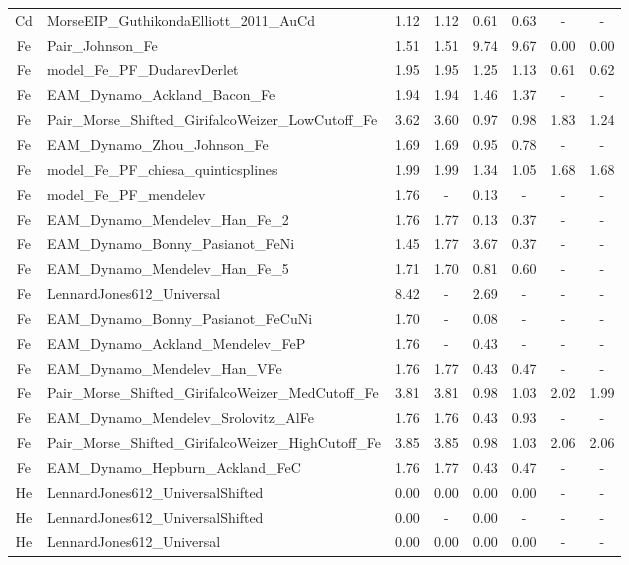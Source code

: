 \documentclass[%
 reprint,
 amsmath,amssymb,
 aps,
]{revtex4-1}
\begin{document}
\begin{longtable*}{@{\extracolsep{\fill}} c l c c c c c c}
 Cd & MorseEIP\_GuthikondaElliott\_2011\_AuCd & 1.12 & 1.12 & 0.61 & 0.63 & - & - \\
 Fe & Pair\_Johnson\_Fe & 1.51 & 1.51 & 9.74 & 9.67 & 0.00 & 0.00 \\
 Fe & model\_Fe\_PF\_DudarevDerlet & 1.95 & 1.95 & 1.25 & 1.13 & 0.61 & 0.62 \\
 Fe & EAM\_Dynamo\_Ackland\_Bacon\_Fe & 1.94 & 1.94 & 1.46 & 1.37 & - & - \\
 Fe & Pair\_Morse\_Shifted\_GirifalcoWeizer\_LowCutoff\_Fe & 3.62 & 3.60 & 0.97 & 0.98 & 1.83 & 1.24 \\
 Fe & EAM\_Dynamo\_Zhou\_Johnson\_Fe & 1.69 & 1.69 & 0.95 & 0.78 & - & - \\
 Fe & model\_Fe\_PF\_chiesa\_quinticsplines & 1.99 & 1.99 & 1.34 & 1.05 & 1.68 & 1.68 \\
 Fe & model\_Fe\_PF\_mendelev & 1.76 & - & 0.13 & - & - & - \\
 Fe & EAM\_Dynamo\_Mendelev\_Han\_Fe\_2 & 1.76 & 1.77 & 0.13 & 0.37 & - & - \\
 Fe & EAM\_Dynamo\_Bonny\_Pasianot\_FeNi & 1.45 & 1.77 & 3.67 & 0.37 & - & - \\
 Fe & EAM\_Dynamo\_Mendelev\_Han\_Fe\_5 & 1.71 & 1.70 & 0.81 & 0.60 & - & - \\
 Fe & LennardJones612\_Universal & 8.42 & - & 2.69 & - & - & - \\
 Fe & EAM\_Dynamo\_Bonny\_Pasianot\_FeCuNi & 1.70 & - & 0.08 & - & - & - \\
 Fe & EAM\_Dynamo\_Ackland\_Mendelev\_FeP & 1.76 & - & 0.43 & - & - & - \\
 Fe & EAM\_Dynamo\_Mendelev\_Han\_VFe & 1.76 & 1.77 & 0.43 & 0.47 & - & - \\
 Fe & Pair\_Morse\_Shifted\_GirifalcoWeizer\_MedCutoff\_Fe & 3.81 & 3.81 & 0.98 & 1.03 & 2.02 & 1.99 \\
 Fe & EAM\_Dynamo\_Mendelev\_Srolovitz\_AlFe & 1.76 & 1.76 & 0.43 & 0.93 & - & - \\
 Fe & Pair\_Morse\_Shifted\_GirifalcoWeizer\_HighCutoff\_Fe & 3.85 & 3.85 & 0.98 & 1.03 & 2.06 & 2.06 \\
 Fe & EAM\_Dynamo\_Hepburn\_Ackland\_FeC & 1.76 & 1.77 & 0.43 & 0.47 & - & - \\
 He & LennardJones612\_UniversalShifted & 0.00 & 0.00 & 0.00 & 0.00 & - & - \\
 He & LennardJones612\_UniversalShifted & 0.00 & - & 0.00 & - & - & - \\
 He & LennardJones612\_Universal & 0.00 & 0.00 & 0.00 & 0.00 & - & - \\

\end{longtable*}
\end{document}
